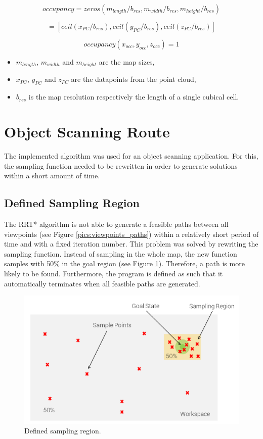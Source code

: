 \begin{equation}
occupancy=zeros(m_{length}/b_{res},m_{width}/b_{res},m_{height}/b_{res})
\label{eq:occupancy}
\end{equation} 

\begin{equation}
[x_{occ},y_{occ},z_{occ}]=[ceil(x_{PC}/b_{res}),ceil(y_{PC}/b_{res}),ceil(z_{PC}/b_{res})]
\label{eq:transformation}
\end{equation}

\begin{equation}
occupancy(x_{occ},y_{occ},z_{occ})=1
\label{eq:transformation_occupancy}
\end{equation} 

\begin{itemize}
	\item
	$m_{length},\,m_{width}$ and $m_{height}$ are the map sizes,
	\item
	$x_{PC},\,y_{PC}$ and $z_{PC}$ are the datapoints from the point cloud,
	\item
	$b_{res}$ is the map resolution respectively the length of a single cubical cell.
\end{itemize}

\section{Object Scanning Route}

The implemented algorithm was used for an object scanning application. For this, the sampling function needed to be rewritten in order to generate solutions within a short amount of time. 

\subsection{Defined Sampling Region}

The RRT* algorithm is not able to generate a feasible paths between all viewpoints (see Figure \ref{pics:viewpoints_paths}) within a relatively short period of time and with a fixed iteration number. This problem was solved by rewriting the sampling function. Instead of sampling in the whole map, the new function samples with 50\% in the goal region (see Figure \ref{pics:sampling}). Therefore, a path is more likely to be found. Furthermore, the program is defined as such that it automatically terminates when all feasible paths are generated. 

\begin{figure} [h]
	\centering
	\includegraphics[width=1\textwidth]{images/sampling_regions.png}
	\caption{Defined sampling region.}
	\label{pics:sampling}
\end{figure}
